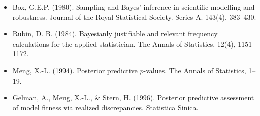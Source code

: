 \begin{itemize}
\item
  Box, G.E.P. (1980). Sampling and Bayes' inference in scientific modelling and
  robustness. Journal of the Royal Statistical Society. Series A. 143(4), 383–430.
\item
  Rubin, D. B. (1984). Bayesianly justifiable and relevant frequency
  calculations for the applied statistician. The Annals of Statistics,
  12(4), 1151–1172.
\item
  Meng, X.-L. (1994). Posterior predictive $p$-values. The Annals of
  Statistics, 1–19.
\item
  Gelman, A., Meng, X.-L., \& Stern, H. (1996). Posterior predictive assessment
  of model fitness via realized discrepancies. Statistica Sinica.
\end{itemize}
